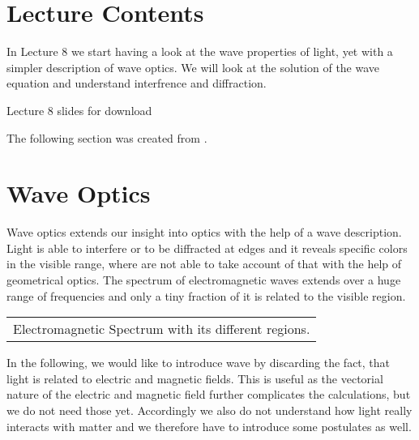 \documentclass[letterpaper,10pt,english]{sphinxmanual}
\let\sphinxpxdimen\pdfpxdimen\else\newdimen\sphinxpxdimen
\begin{document}
\section{Lecture Contents}
\label{\detokenize{lectures/L8/overview_8:lecture-contents}}\label{\detokenize{lectures/L8/overview_8::doc}}
In Lecture 8 we start having a look at the wave properties of light, yet with a simpler description of wave optics. We will look at the solution of the wave equation and understand interfrence and diffraction.

\noindent\sphinxincludegraphics[width=600\sphinxpxdimen]{{slides11}.png}

Lecture 8 slides for download 

The following section was created from .


\section{Wave Optics}
\label{\detokenize{notebooks/L8/Wave Optics:Wave-Optics}}\label{\detokenize{notebooks/L8/Wave Optics::doc}}
Wave optics extends our insight into optics with the help of a wave description. Light is able to interfere or to be diffracted at edges and it reveals specific colors in the visible range, where are not able to take account of that with the help of geometrical optics. The spectrum of electromagnetic waves extends over a huge range of frequencies and only a tiny fraction of it is related to the visible region.


\begin{savenotes}\sphinxattablestart
\centering
\begin{tabulary}{\linewidth}[t]{|T|}
\hline
\sphinxstyletheadfamily 
{}
\\
\hline
{} Electromagnetic Spectrum with its different regions.
\\
\hline
\end{tabulary}
\par
\sphinxattableend\end{savenotes}

In the following, we would like to introduce wave by discarding the fact, that light is related to electric and magnetic fields. This is useful as the vectorial nature of the electric and magnetic field further complicates the calculations, but we do not need those yet. Accordingly we also do not understand how light really interacts with matter and we therefore have to introduce some postulates as well.
\end{document}
